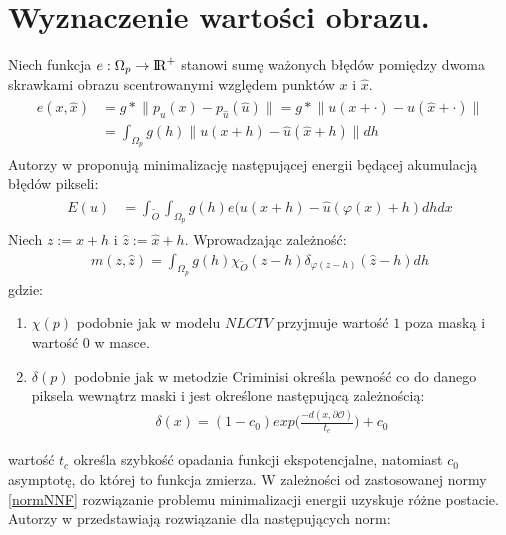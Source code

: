 \documentclass[12pt, twoside, openany]{report}
\theoremstyle{definition}
\begin{document}
\section{Wyznaczenie wartości obrazu.}
Niech funkcja $e: \Omega_{p} \rightarrow {\rm I\!R}^{+}$ stanowi sumę ważonych błędów pomiędzy dwoma skrawkami obrazu scentrowanymi względem punktów $x$ i $\hat{x}$.
\begin{align}
\begin{aligned}
e(x, \hat{x}) &= g \ast \big\| p_{u}(x) - p_{\hat{u}}(\hat{u}) \big\| = g \ast \big\| u(x + \cdot) - u(\hat{x} + \cdot) \big\| \\ 
&= \int_{\Omega_{p}} g(h) \big\| u(x+h) - \hat{u}(\hat{x} +h) \big\|dh
\label{patchErrorVFI}
\end{aligned}
\end{align} 
Autorzy w \cite{arias2011variational} proponują minimalizację następującej energii będącej akumulacją błędów pikseli:
\begin{align}
\begin{aligned}
E(u) &= \int_{\widetilde O}\int_{\Omega_{p}}g(h)e(u(x+h) - \hat{u}(\varphi(x)+h)dhdx
\label{patchMatchEnergy}
\end{aligned}
\end{align} 
Niech $z := x+h$ i $\hat{z} := \hat{x}+h$. Wprowadzając zależność:
\begin{align}
m(z,\hat{z}) = \int_{\Omega_{p}}g(h)\chi_{\widetilde O}(z-h)\delta_{\varphi(z-h)}(\hat{z}-h)dh
\end{align}
gdzie:
\begin{enumerate}
\item
$\chi(p)$ podobnie jak w modelu $NLCTV$ przyjmuje wartość $1$ poza maską i wartość $0$ w masce.
\item
$\delta(p)$ podobnie jak w metodzie Criminisi określa pewność co do danego piksela wewnątrz maski i jest określone następującą zależnością:
\begin{align}
\delta(x)=(1-c_0)exp\bigg(\frac{-d(x,\partial\mathcal{O})}{t_c}\bigg) + c_0 
\end{align}
\end{enumerate}
wartość $t_c$ określa szybkość opadania funkcji ekspotencjalne, natomiast $c_0$ asymptotę, do której to funkcja zmierza. W zależności od zastosowanej normy \eqref{normNNF} rozwiązanie problemu minimalizacji energii uzyskuje różne postacie. Autorzy w \cite{arias2011variational} przedstawiają rozwiązanie dla następujących norm:
\end{document}
